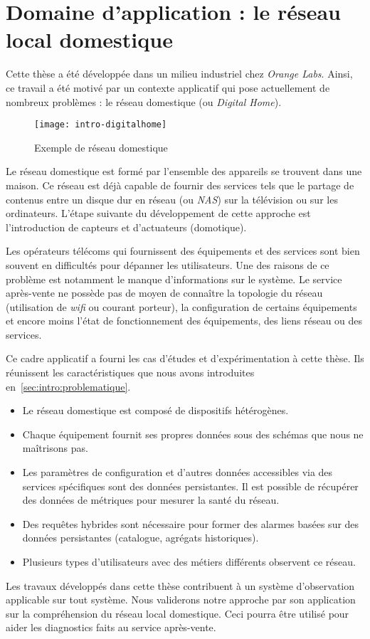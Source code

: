 \section{Domaine d'application : le réseau local domestique}\label{sec:introduction:digitalhome}
Cette thèse a été développée dans un milieu industriel chez \textit{Orange Labs}. Ainsi, ce travail a été motivé par un contexte applicatif qui pose actuellement de nombreux problèmes : le réseau domestique (ou \textit{Digital Home}).

\begin{figure}[ht]
\centering
\texttt{[image: intro-digitalhome]}
\caption{Exemple de réseau domestique}
\end{figure}

Le réseau domestique est formé par l'ensemble des appareils se trouvent dans une maison. Ce réseau est déjà capable de fournir des services tels que le partage de contenus entre un disque dur en réseau (ou \textit{NAS}) sur la télévision ou sur les ordinateurs. L'étape suivante du développement de cette approche est l'introduction de capteurs et d'actuateurs (domotique).

Les opérateurs télécoms qui fournissent des équipements et des services sont bien souvent en difficultés pour dépanner les utilisateurs. Une des raisons de ce problème est notamment le manque d'informations sur le système. Le service après-vente ne possède pas de moyen de connaître la topologie du réseau (utilisation de \textit{wifi} ou courant porteur), la configuration de certains équipements et encore moins l'état de fonctionnement des équipements, des liens réseau ou des services.

Ce cadre applicatif a fourni les cas d'études et d'expérimentation à cette thèse. Ils réunissent les caractéristiques que nous avons introduites en~\ref{sec:intro:problematique}.
\begin{itemize}
	\item Le réseau domestique est composé de dispositifs hétérogènes.
	\item Chaque équipement fournit ses propres données sous des schémas que nous ne maîtrisons pas.
	\item Les paramètres de configuration et d'autres données accessibles via des services spécifiques sont des données persistantes. Il est possible de récupérer des données de métriques pour mesurer la santé du réseau.
	\item Des requêtes hybrides sont nécessaire pour former des alarmes basées sur des données persistantes (catalogue, agrégats historiques).
	\item Plusieurs types d'utilisateurs avec des métiers différents observent ce réseau.
\end{itemize}

Les travaux développés dans cette thèse contribuent à un système d'observation applicable sur tout système. Nous validerons notre approche par son application sur la compréhension du réseau local domestique. Ceci pourra être utilisé pour aider les diagnostics faits au service après-vente.
